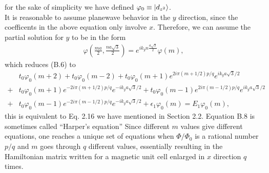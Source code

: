 \documentclass{report}
\newcommand{\f}[2]{\dfrac{#1}{#2}}
\begin{document}
for the sake of simplicity we have defined $\varphi_{0} \equiv \ket{d_{z^{2}}}$.\\
It is reasonable to assume planewave behavior in the $y$ direction, since the coefficents in the above equation only involve $x$. Therefore, we can assume the partial solution for $y$ to be in the form
\begin{gather}
	\varphi(\frac{ma}{2},\frac{na\sqrt{3}}{2}) = e^{i k_{y} n \frac{a\sqrt{3}}{2}} \varphi(m),
\end{gather}
which reduces (B.6) to
\begin{equation}
	\begin{aligned}
		  & t_{0} \varphi_{0}(m + 2) + t_{0} \varphi_{0}(m - 2) + t_{0} \varphi_{0}(m + 1) e^{2 i \pi (m + 1 /2) p/ q} e^{i k_{y} a\sqrt{3} / 2}                              \\
		+ & t_{0} \varphi_{0}(m + 1) e^{-2 i \pi (m + 1 /2) p/ q} e^{-i k_{y} a\sqrt{3} / 2} + t_{0} \varphi_{0}(m - 1) e^{2 i \pi (m - 1 /2) p/ q} e^{i k_{y} a\sqrt{3} / 2} \\
		+ & t_{0} \varphi_{0}(m - 1) e^{-2 i \pi (m - 1 /2) p/ q} e^{-i k_{y} a\sqrt{3} / 2} + \epsilon_{1} \varphi_{0}(m) = E_{1} \varphi_{0}(m),
	\end{aligned}
\end{equation}
this is equivalent to Eq. 2.16 we have mentioned in Section 2.2. Equation B.8 is sometimes called ``Harper's equation''\cite{harper1955general,PhysRevB.14.2239} Since different $m$ values give different equations, one reaches a unique set of equations when $\Phi / \Phi_{0}$ is a rational number $p / q$ and $m$ goes through $q$ different values, essentially resulting in the Hamiltonian matrix written for a magnetic unit cell enlarged in $x$ direction $q$ times.\\
\end{document}
